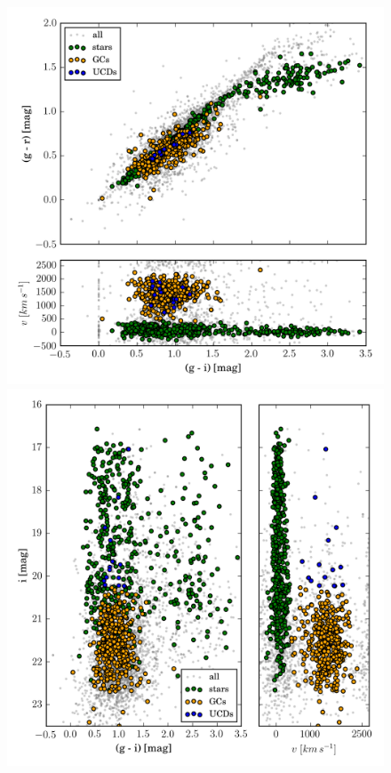 \documentclass[useAMS,usenatbib]{mn2e}
\begin{document}

\begin{figure}
\centering
\includegraphics[width=\columnwidth]{figures/cc.png} 
\includegraphics[width=\columnwidth]{figures/cm.png} 

\end{figure}
\end{document}
